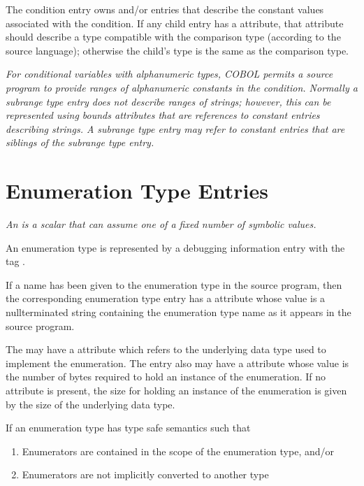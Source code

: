 The condition entry owns \DWTAGconstant{} and/or
\DWTAGsubrangetype{} entries that describe the constant
values associated with the condition. If any child entry 
has
a \DWATtype{} attribute,
that attribute should describe a type
compatible with the comparison type (according to the source
language); otherwise the child\textquoteright s type is the same as the
comparison type.

\textit{For conditional variables with alphanumeric types, COBOL
permits a source program to provide ranges of alphanumeric
constants in the condition. Normally a subrange type entry
does not describe ranges of strings; however, this can be
represented using bounds attributes that are references to
constant entries describing strings. A subrange type entry may
refer to constant entries that are siblings of the subrange
type entry.}


\section{Enumeration Type Entries}
\label{chap:enumerationtypeentries}

\textit{An  is a scalar that can assume one of
a fixed number of symbolic values.}

An enumeration type is represented by a debugging information
entry with the tag 
\DWTAGenumerationtypeTARG.

If a name has been given to the enumeration type in the source
program, then the corresponding enumeration type entry has
a \DWATname{} attribute
whose value is a null\dash terminated
string containing the enumeration type name as it appears
in the source program. 

The 
may have 
a \DWATtype{} attribute
which refers to the underlying data type used to implement
the enumeration. The entry also may have a 
\DWATbytesize{} attribute whose 
 value is the number of bytes 
required to hold an instance of the enumeration. If no \DWATbytesize{} attribute 
is present, the size for holding an instance of the enumeration is given by the size 
of the underlying data type.

If an enumeration type has type safe 
semantics such that

\begin{enumerate}[1. ]
\item Enumerators are contained in the scope of the enumeration type, and/or

\item Enumerators are not implicitly converted to another type
\end{enumerate}

